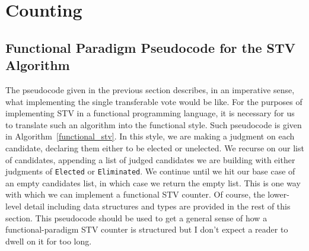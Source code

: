 \section{Counting}

\subsection{Functional Paradigm Pseudocode for the STV Algorithm}

The pseudocode given in the previous section describes, in an imperative sense,
what implementing the single transferable vote would be like. For the purposes
of implementing STV in a functional programming language, it is necessary for us
to translate such an algorithm into the functional style. Such pseudocode is
given in Algorithm~\ref{functional_stv}. In this style, we are making a judgment
on each candidate, declaring them either to be elected or unelected. We recurse
on our list of candidates, appending a list of judged candidates we are building
with either judgments of \texttt{Elected} or \texttt{Eliminated}. We continue
until we hit our base case of an empty candidates list, in which case we return
the empty list. This is one way with which we can implement a functional STV
counter. Of course, the lower-level detail including data structures and types
are provided in the rest of this section. This pseudocode should be used to get
a general sense of how a functional-paradigm STV counter is structured but I
don't expect a reader to dwell on it for too long. 

